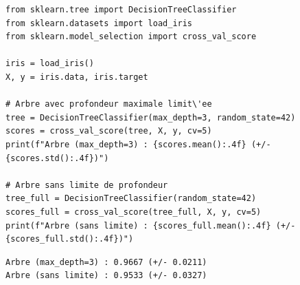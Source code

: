 \begin{center}
\end{center}

\begin{codeblock}[title=\textbf{Python}]
\begin{verbatim}
from sklearn.tree import DecisionTreeClassifier
from sklearn.datasets import load_iris
from sklearn.model_selection import cross_val_score

iris = load_iris()
X, y = iris.data, iris.target

# Arbre avec profondeur maximale limit\'ee
tree = DecisionTreeClassifier(max_depth=3, random_state=42)
scores = cross_val_score(tree, X, y, cv=5)
print(f"Arbre (max_depth=3) : {scores.mean():.4f} (+/- {scores.std():.4f})")

# Arbre sans limite de profondeur
tree_full = DecisionTreeClassifier(random_state=42)
scores_full = cross_val_score(tree_full, X, y, cv=5)
print(f"Arbre (sans limite) : {scores_full.mean():.4f} (+/- {scores_full.std():.4f})")
\end{verbatim}
\end{codeblock}

\begin{codeoutput}
\begin{verbatim}
Arbre (max_depth=3) : 0.9667 (+/- 0.0211)
Arbre (sans limite) : 0.9533 (+/- 0.0327)
\end{verbatim}
\end{codeoutput}


